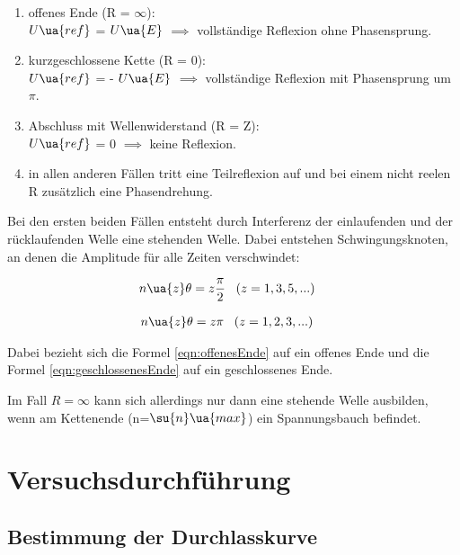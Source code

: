 \renewcommand{\labelenumi}{\alph{enumi})}
\begin{enumerate}
  \item offenes Ende (R = $\infty$): \\
        $U\ua{ref}$ = $U\ua{E}$ $\implies$ vollständige Reflexion ohne Phasensprung.

  \item kurzgeschlossene Kette (R = 0): \\
        $U\ua{ref}$ = - $U\ua{E}$ $\implies$ vollständige Reflexion mit Phasensprung um $\pi$.

  \item Abschluss mit Wellenwiderstand (R = Z): \\
        $U\ua{ref}$ = 0 $\implies$ keine Reflexion.

  \item in allen anderen Fällen tritt eine Teilreflexion auf und bei einem nicht
        reelen R zusätzlich eine Phasendrehung.
\end{enumerate}

Bei den ersten beiden Fällen entsteht durch Interferenz der einlaufenden
und der rücklaufenden Welle eine stehenden Welle.
Dabei entstehen Schwingungsknoten, an denen die Amplitude für alle
Zeiten verschwindet:

\begin{align}
  n\ua{z}\theta &= z \frac{\pi}{2} \, \, \, \, \, (z = 1,3,5, ...)
  \label{eqn:offenesEnde}
\end{align}

\begin{align}
  n\ua{z}\theta &= z \pi \, \, \, \, \, (z = 1,2,3, ...)
  \label{eqn:geschlossenesEnde}
\end{align}

Dabei bezieht sich die Formel \eqref{eqn:offenesEnde} auf ein offenes Ende und
die Formel \eqref{eqn:geschlossenesEnde} auf ein geschlossenes Ende.

Im Fall $R = \infty$ kann sich allerdings nur dann eine stehende Welle ausbilden,
wenn am Kettenende (n=$\su{n}\ua{max}$) ein Spannungsbauch befindet.

\newpage

\section{Versuchsdurchführung}

\subsection{Bestimmung der Durchlasskurve}

